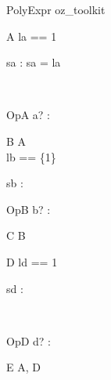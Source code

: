 \begin{zsection}
  \SECTION PolyExpr \parents oz\_toolkit
\end{zsection}

\begin{class}{A}
  la == 1\\
  \begin{state}
    sa : \nat
  \where
    sa = la
  \end{state}\\
  \begin{op}{OpA}
    a? : \nat
  \end{op}
\end{class}

\begin{class}{B}
  \inherits A\\
  lb == \{1\}\\
  \begin{state}
    sb : \power \nat
  \end{state}
  \begin{op}{OpB}
    b? : \power \nat
  \end{op}
\end{class}

\begin{class}{C}
  \inherits B
\end{class}

\begin{class}{D}
  ld == 1\\
  \begin{state}
    sd : \nat
  \end{state}\\
  \begin{op}{OpD}
    d? : \nat
  \end{op}
\end{class}

\begin{class}{E}
  \inherits A, D
\end{class}

